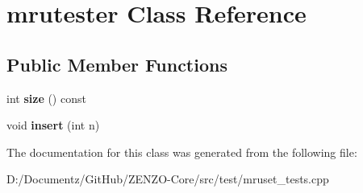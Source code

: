 \hypertarget{classmrutester}{}\section{mrutester Class Reference}
\label{classmrutester}
\subsection*{Public Member Functions}
\begin{DoxyCompactItemize}
\item 
\mbox{\label{classmrutester_a3f2e7d14515f218653bb2731e5012248}} 
int {\bfseries size} () const
\item 
\mbox{\label{classmrutester_a381e816e8339dd46d2079eaca3643567}} 
void {\bfseries insert} (int n)
\end{DoxyCompactItemize}


The documentation for this class was generated from the following file\+:\begin{DoxyCompactItemize}
\item 
D\+:/\+Documentz/\+Git\+Hub/\+Z\+E\+N\+Z\+O-\/\+Core/src/test/mruset\+\_\+tests.\+cpp\end{DoxyCompactItemize}

